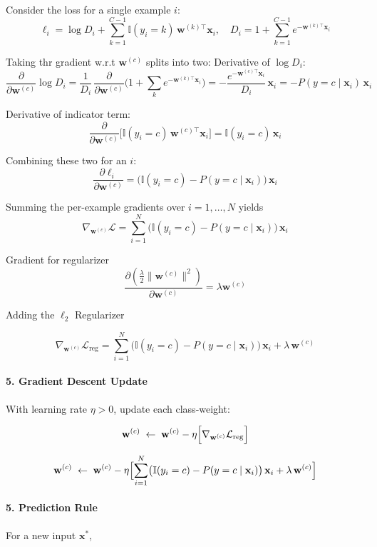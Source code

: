 \documentclass{article}
\begin{document}
Consider the loss for a single example \(i\):
\[
\ell_i
=\log D_i
+\sum_{k=1}^{C-1}\mathbb{I}(y_i=k)\,\mathbf{w}^{(k)\top}\mathbf{x}_i,
\quad
D_i = 1 + \sum_{k=1}^{C-1}e^{-\mathbf{w}^{(k)\top}\mathbf{x}_i}
\]

Taking thr gradient w.r.t \(\mathbf{w}^{(c)}\) splits into two:
Derivative of \(\log D_i\):
\[
\frac{\partial}{\partial \mathbf{w}^{(c)}}\log D_i
=\frac{1}{D_i}\,
\frac{\partial}{\partial \mathbf{w}^{(c)}}
\bigl(1 + \sum_{k}e^{-\mathbf{w}^{(k)\top}\mathbf{x}_i}\bigr)
=-\frac{e^{-\mathbf{w}^{(c)\top}\mathbf{x}_i}}{D_i}\,\mathbf{x}_i
=-P(y=c\mid \mathbf{x}_i)\,\mathbf{x}_i
\]

Derivative of indicator term:
\[
\frac{\partial}{\partial \mathbf{w}^{(c)}}
\bigl[\mathbb{I}(y_i=c)\,\mathbf{w}^{(c)\top}\mathbf{x}_i\bigr]
=\mathbb{I}(y_i=c)\,\mathbf{x}_i
\]

Combining these two for an \(i\):
\[
\frac{\partial \ell_i}{\partial \mathbf{w}^{(c)}}
=
\bigl(\mathbb{I}(y_i=c)-P(y=c\mid \mathbf{x}_i)\bigr)\,\mathbf{x}_i
\]


Summing the per-example gradients over \(i=1,\dots,N\) yields 
\[
\nabla_{\mathbf{w}^{(c)}}\mathcal{L}
=
\sum_{i=1}^N
\bigl(\mathbb{I}(y_i=c)-P(y=c\mid \mathbf{x}_i)\bigr)\,\mathbf{x}_i
\]

Gradient for regularizer
\[
\frac{\partial (\frac{\lambda}{2}\bigl\|\mathbf{w}^{(c)}\bigr\|^2)}
{\partial \mathbf{w}^{(c)}}
= \lambda\mathbf{w}^{(c)}
\]

Adding the \(\ell_2\) Regularizer

\[
\nabla_{\mathbf{w}^{(c)}}\mathcal{L}_{\mathrm{reg}}
=
\sum_{i=1}^N
\bigl(\mathbb{I}(y_i=c)-P(y=c\mid \mathbf{x}_i)\bigr)\,\mathbf{x}_i
+\lambda\,\mathbf{w}^{(c)}
\]


\paragraph{5. Gradient Descent Update}
With learning rate \(\eta>0\), update each class‐weight:


\[
\mathbf{w}^{(c)} \;\leftarrow\;
\mathbf{w}^{(c)}
-\eta\Bigl[\nabla_{\mathbf{w}^{(c)}}\mathcal{L}_{\mathrm{reg}}\Bigr]
\]

\[
\mathbf{w}^{(c)} \;\leftarrow\;
\mathbf{w}^{(c)}
-\eta\Bigl[\sum_{i=1}^N
\bigl(\mathbb{I}(y_i=c)-P(y=c\mid \mathbf{x}_i)\bigr)\,\mathbf{x}_i
+\lambda\,\mathbf{w}^{(c)}\Bigr]
\]


\paragraph{5. Prediction Rule}
For a new input \(\mathbf{x}^*\),
\end{document}
